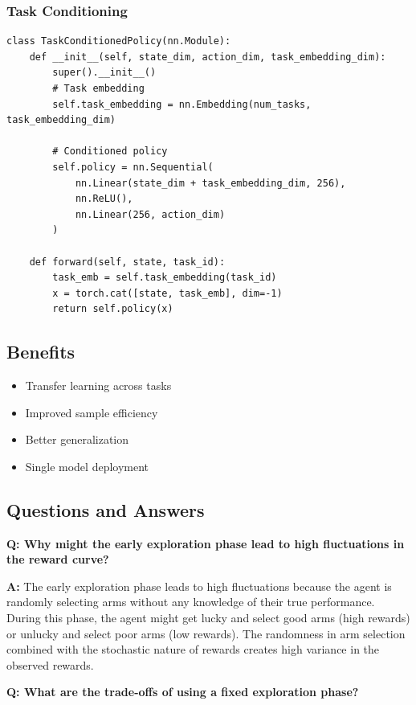 \documentclass[12pt]{article}
\begin{document}
{{{\subsubsection{Task Conditioning}

\begin{verbatim}
class TaskConditionedPolicy(nn.Module):
    def __init__(self, state_dim, action_dim, task_embedding_dim):
        super().__init__()
        # Task embedding
        self.task_embedding = nn.Embedding(num_tasks, task_embedding_dim)
        
        # Conditioned policy
        self.policy = nn.Sequential(
            nn.Linear(state_dim + task_embedding_dim, 256),
            nn.ReLU(),
            nn.Linear(256, action_dim)
        )
    
    def forward(self, state, task_id):
        task_emb = self.task_embedding(task_id)
        x = torch.cat([state, task_emb], dim=-1)
        return self.policy(x)
\end{verbatim}

\subsection{Benefits}

\begin{itemize}
\item Transfer learning across tasks
\item Improved sample efficiency
\item Better generalization
\item Single model deployment
\end{itemize}

\subsection{Questions and Answers}

\textbf{Q: Why might the early exploration phase lead to high fluctuations in the reward curve?}

\textbf{A:} The early exploration phase leads to high fluctuations because the agent is randomly selecting arms without any knowledge of their true performance. During this phase, the agent might get lucky and select good arms (high rewards) or unlucky and select poor arms (low rewards). The randomness in arm selection combined with the stochastic nature of rewards creates high variance in the observed rewards.

\textbf{Q: What are the trade-offs of using a fixed exploration phase?}

}}}
\end{document}

